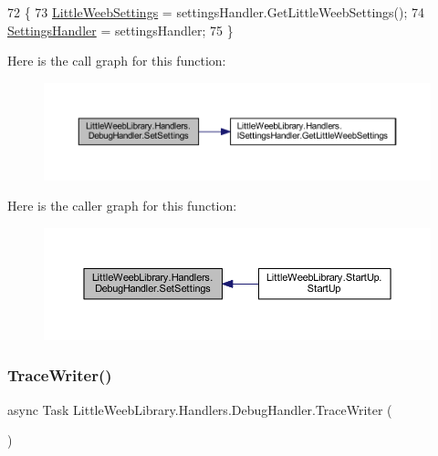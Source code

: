 \begin{DoxyCode}
72         \{
73             \mbox{\hyperlink{class_little_weeb_library_1_1_settings_1_1_little_weeb_settings}{LittleWeebSettings}} = settingsHandler.GetLittleWeebSettings();
74             \mbox{\hyperlink{class_little_weeb_library_1_1_handlers_1_1_debug_handler_a6c33170a85d7efd28a204285e1851dc5}{SettingsHandler}} = settingsHandler;
75         \}
\end{DoxyCode}
Here is the call graph for this function\+:\nopagebreak
\begin{figure}[H]
\begin{center}
\leavevmode
\includegraphics[width=350pt]{class_little_weeb_library_1_1_handlers_1_1_debug_handler_ac253016968e2d0141b49ab227a715242_cgraph}
\end{center}
\end{figure}
Here is the caller graph for this function\+:\nopagebreak
\begin{figure}[H]
\begin{center}
\leavevmode
\includegraphics[width=350pt]{class_little_weeb_library_1_1_handlers_1_1_debug_handler_ac253016968e2d0141b49ab227a715242_icgraph}
\end{center}
\end{figure}
\mbox{\label{class_little_weeb_library_1_1_handlers_1_1_debug_handler_a733f22d0dabe84bf05463bdaeb2da250}} 
\subsubsection{\texorpdfstring{Trace\+Writer()}{TraceWriter()}}
{\footnotesize\ttfamily async Task Little\+Weeb\+Library.\+Handlers.\+Debug\+Handler.\+Trace\+Writer (\begin{DoxyParamCaption}{ }\end{DoxyParamCaption})\hspace{0.3cm}{\ttfamily [private]}}




